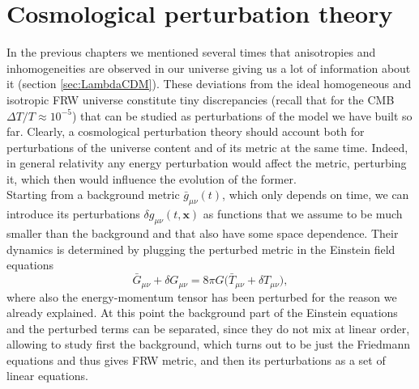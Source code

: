 \chapter{Cosmological perturbation theory}
\label{chap:perturbations}
In the previous chapters we mentioned several times that anisotropies and inhomogeneities are observed in our universe giving us a lot of information about it (section \ref{sec:LambdaCDM}). These deviations from the ideal homogeneous and isotropic FRW universe constitute tiny discrepancies (recall that for the CMB $\Delta T/T\approx 10^{-5}$) that can be studied as perturbations of the model we have built so far.
Clearly, a cosmological perturbation theory should account both for perturbations of the universe content and of its metric at the same time. Indeed, in general relativity any energy perturbation would affect the metric, perturbing it, which then would influence the evolution of the former.\\
Starting from a background metric $\bar g_{\mu\nu}(t)$, which only depends on time, we can introduce its perturbations $\delta g_{\mu\nu}(t, \mathbf x)$ as functions that we assume to be much smaller than the background and that also have some space dependence. Their dynamics is determined by plugging the perturbed metric in the Einstein field equations 
$$\bar G_{\mu\nu}+\delta G_{\mu\nu}=8\pi G\Big(\bar T_{\mu\nu}+\delta T_{\mu\nu}\Big),$$ where also the energy-momentum tensor has been perturbed for the reason we already explained. At this point the background part of the Einstein equations and the perturbed terms can be separated, since they do not mix at linear order, allowing to study first the background, which turns out to be just the Friedmann equations and thus gives FRW metric, and then its perturbations as a set of linear equations.
